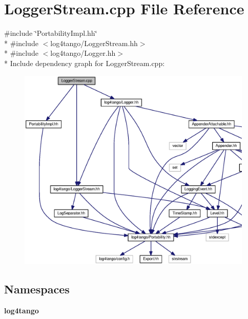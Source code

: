 \section{Logger\-Stream.\-cpp File Reference}
\label{LoggerStream_8cpp}
{\ttfamily \#include \char`\"{}Portability\-Impl.\-hh\char`\"{}}\\*
{\ttfamily \#include $<$log4tango/\-Logger\-Stream.\-hh$>$}\\*
{\ttfamily \#include $<$log4tango/\-Logger.\-hh$>$}\\*
Include dependency graph for Logger\-Stream.\-cpp\-:
\nopagebreak
\begin{figure}[H]
\begin{center}
\leavevmode
\includegraphics[width=350pt]{d2/d93/LoggerStream_8cpp__incl}
\end{center}
\end{figure}
\subsection*{Namespaces}
\begin{DoxyCompactItemize}
\item 
{\bf log4tango}
\end{DoxyCompactItemize}
